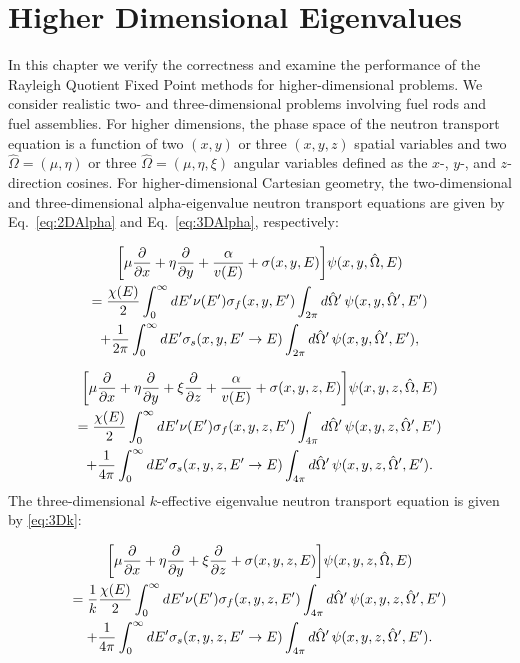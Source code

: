 \chapter{Higher Dimensional Eigenvalues}

In this chapter we verify the correctness and examine the performance of the Rayleigh Quotient Fixed Point methods for higher-dimensional problems. We consider realistic two- and three-dimensional problems involving fuel rods and fuel assemblies. For higher dimensions, the phase space of the neutron transport equation is a function of two $(x, y)$ or three $(x, y, z)$ spatial variables and two $\hat{\Omega} = (\mu, \eta)$ or three $\hat{\Omega} =  (\mu, \eta, \xi)$ angular variables defined as the $x$-, $y$-, and $z$-direction cosines. For higher-dimensional Cartesian geometry, the two-dimensional and three-dimensional alpha-eigenvalue neutron transport equations are given by Eq.~\ref{eq:2DAlpha} and Eq.~\ref{eq:3DAlpha}, respectively:

\begin{multline}
\bigg [ \mu \frac{\partial}{\partial x} + \eta \frac{\partial}{\partial y} + \frac{\alpha}{v(E)} + \sigma(x,y,E) \bigg ] \psi(x,y,\hat{\Omega},E) \\ = \frac{\chi(E)}{2} \int_{0}^{\infty} \mathop{}\!d E' \nu(E') \sigma_{f}(x,y,E') \int_{2\pi} \mathop{}\!d \hat{\Omega}' \, \psi(x,y, \hat{\Omega}', E') \\ + \frac{1}{2\pi} \int_{0}^{\infty} \mathop{}\!d E' \sigma_{s}(x, y, E' \rightarrow E) \int_{2\pi} \mathop{}\!d \hat{\Omega}' \, \psi(x,y, \hat{\Omega}',E'),
\label{eq:2DAlpha}
\end{multline}

\begin{multline}
\bigg [ \mu \frac{\partial}{\partial x} + \eta \frac{\partial}{\partial y} + \xi \frac{\partial}{\partial z} + \frac{\alpha}{v(E)} + \sigma(x,y,z,E) \bigg ] \psi(x,y,z,\hat{\Omega}, E) \\ = \frac{\chi(E)}{2} \int_{0}^{\infty} \mathop{}\!d E' \nu(E') \sigma_{f}(x,y,z,E') \int_{4\pi} \mathop{}\!d \hat{\Omega}' \, \psi(x,y,z, \hat{\Omega}',E') \\ + \frac{1}{4\pi} \int_{0}^{\infty} \mathop{}\!d E' \sigma_{s}(x, y, z, E' \rightarrow E) \int_{4\pi} \mathop{}\!d \hat{\Omega}' \, \psi(x,y,z, \hat{\Omega}',E').
\label{eq:3DAlpha}
\end{multline}
The three-dimensional $k$-effective eigenvalue neutron transport equation is given by \ref{eq:3Dk}:

\begin{multline}
\bigg [ \mu \frac{\partial}{\partial x} + \eta \frac{\partial}{\partial y} + \xi \frac{\partial}{\partial z} + \sigma(x,y,z,E) \bigg ] \psi(x,y,z,\hat{\Omega}, E) \\ = \frac{1}{k}\frac{\chi(E)}{2} \int_{0}^{\infty} \mathop{}\!d E' \nu(E') \sigma_{f}(x,y,z,E') \int_{4\pi} \mathop{}\!d \hat{\Omega}' \, \psi(x,y,z, \hat{\Omega}',E') \\ + \frac{1}{4\pi} \int_{0}^{\infty} \mathop{}\!d E' \sigma_{s}(x, y, z, E' \rightarrow E) \int_{4\pi} \mathop{}\!d \hat{\Omega}' \, \psi(x,y,z, \hat{\Omega}',E').
\label{eq:3Dk}
\end{multline}

